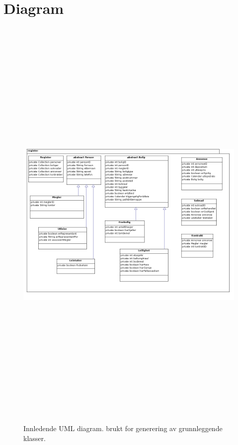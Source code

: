 \chapter{Diagram} \label{appendix:diagram}


\begin{figure}[ht]
\begin{center}
 \includegraphics[angle=90, height=21cm]{./img/appendix/diagram/klassestruktur_uml.png}
 \caption{Innledende UML diagram. brukt for generering av grunnleggende klasser.}
 \label{fig:uml_diag}
 \end{center}
\end{figure}


